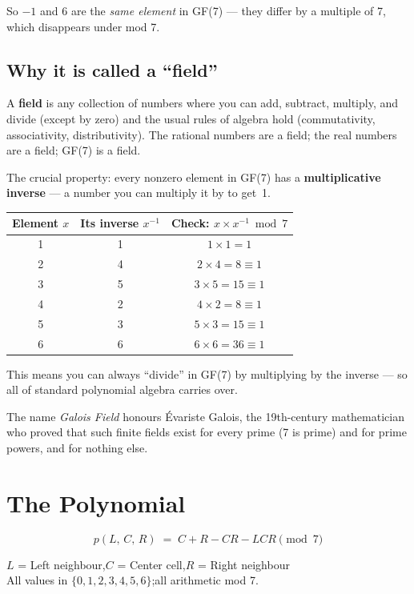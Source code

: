 \documentclass[11pt,a4paper]{article}
\newcommand{\term}[1]{\textbf{#1}}
\begin{document}
So $-1$ and $6$ are the \emph{same element} in GF(7) — they differ by a
multiple of 7, which disappears under mod 7.

\subsection{Why it is called a ``field''}

A \term{field} is any collection of numbers where you can add, subtract,
multiply, and divide (except by zero) and the usual rules of algebra hold
(commutativity, associativity, distributivity).  The rational numbers are a
field; the real numbers are a field; GF(7) is a field.

The crucial property: every nonzero element in GF(7) has a
\term{multiplicative inverse} — a number you can multiply it by to get~1.

\begin{center}
\begin{tabular}{ccc}
\toprule
Element $x$ & Its inverse $x^{-1}$ & Check: $x \times x^{-1} \bmod 7$ \\
\midrule
1 & 1 & $1\times1=1$ \\
2 & 4 & $2\times4=8\equiv1$ \\
3 & 5 & $3\times5=15\equiv1$ \\
4 & 2 & $4\times2=8\equiv1$ \\
5 & 3 & $5\times3=15\equiv1$ \\
6 & 6 & $6\times6=36\equiv1$ \\
\bottomrule
\end{tabular}
\end{center}

This means you can always ``divide'' in GF(7) by multiplying by the
inverse — so all of standard polynomial algebra carries over.

The name \emph{Galois Field} honours Évariste Galois, the 19th-century
mathematician who proved that such finite fields exist for every prime
(7 is prime) and for prime powers, and for nothing else.

\section{The Polynomial}

\begin{tcolorbox}[colback=boxgreen,colframe=green!50!black,
  title=The GTE master polynomial]
\[
  p(L,\,C,\,R) \;=\; C + R - CR - LCR \pmod{7}
\]
\begin{center}
$L$ = Left neighbour,\quad $C$ = Center cell,\quad $R$ = Right neighbour\\
All values in $\{0,1,2,3,4,5,6\}$;\quad all arithmetic mod 7.
\end{center}
\end{tcolorbox}
\end{document}
